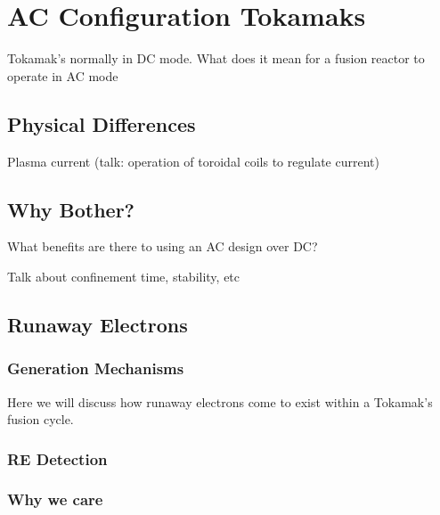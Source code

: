 \section{AC Configuration Tokamaks}

Tokamak's normally in DC mode. What does it mean for a fusion reactor 
to operate in AC mode

\subsection{Physical Differences}

Plasma current (talk: operation of toroidal coils to regulate current)



\subsection{Why Bother?}

What benefits are there to using an AC design over DC?

Talk about confinement time, stability, etc

\subsection{Runaway Electrons}

\subsubsection{Generation Mechanisms}

Here we will discuss how runaway electrons come to exist within a Tokamak's fusion cycle.

\subsubsection{RE Detection}

\subsubsection{Why we care}

